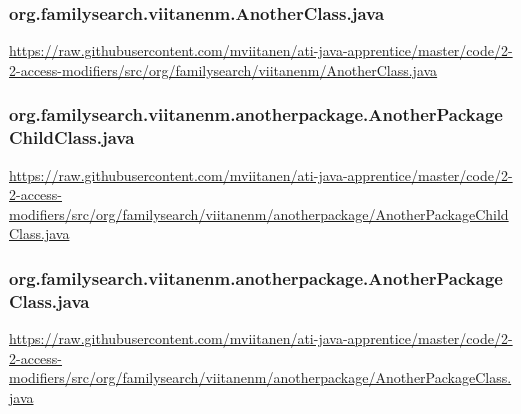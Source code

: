 \vspace{1em}
\subsubsection*{org.familysearch.viitanenm.AnotherClass.java}
\noindent
\begin{minipage}{.6in}
\end{minipage}
\begin{minipage}{6in}
  \url{https://raw.githubusercontent.com/mviitanen/ati-java-apprentice/master/code/2-2-access-modifiers/src/org/familysearch/viitanenm/AnotherClass.java}
\end{minipage}

\vspace{1em}
\subsubsection*{org.familysearch.viitanenm.anotherpackage.AnotherPackageChildClass.java}
\noindent
\begin{minipage}{.6in}
\end{minipage}
\begin{minipage}{6in}
  \url{https://raw.githubusercontent.com/mviitanen/ati-java-apprentice/master/code/2-2-access-modifiers/src/org/familysearch/viitanenm/anotherpackage/AnotherPackageChildClass.java}
\end{minipage}

\vspace{1em}
\subsubsection*{org.familysearch.viitanenm.anotherpackage.AnotherPackageClass.java}
\noindent
\begin{minipage}{.6in}
\end{minipage}
\begin{minipage}{6in}
  \url{https://raw.githubusercontent.com/mviitanen/ati-java-apprentice/master/code/2-2-access-modifiers/src/org/familysearch/viitanenm/anotherpackage/AnotherPackageClass.java}
\end{minipage}